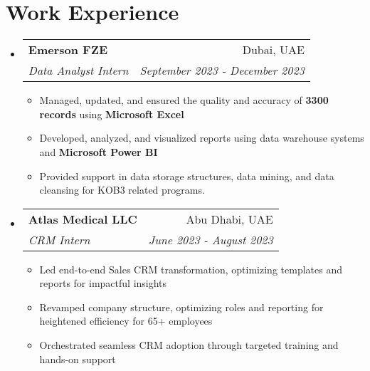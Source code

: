 \documentclass[a4paper,20pt]{article}
\makeatletter
\newcommand{\resumeItemWithoutTitle}[1] {
	\item\small{
		{#1 \vspace{-2pt}}
	}
}
\newcommand{\resumeSubheading}[4] {
	\vspace{-1pt}\item
	\begin{tabular*}{0.97\textwidth}{l@{\extracolsep{\fill}}r}
		\textbf{#1} & #2 \\
		\textit{#3} & \textit{#4} \\
	\end{tabular*}\vspace{-5pt}
}
\newcommand{\resumeSubHeadingListStart}{\begin{itemize}[leftmargin=*]}
\newcommand{\resumeSubHeadingListEnd}{\end{itemize}}
\newcommand{\resumeItemListStart}{\begin{itemize}}
\newcommand{\resumeItemListEnd}{\end{itemize}\vspace{-5pt}}
\makeatother
\begin{document}

\vspace{-3pt}
\section{Work Experience}
	\resumeSubHeadingListStart
		\resumeSubheading{Emerson FZE}{Dubai, UAE} {Data Analyst Intern}{September 2023 - December 2023}
		\resumeItemListStart
			\resumeItemWithoutTitle{Managed, updated, and ensured the quality and accuracy of \textbf{3300 records} using \textbf{Microsoft Excel}}
			\resumeItemWithoutTitle{Developed, analyzed, and visualized reports using data warehouse systems and \textbf{Microsoft Power BI}}
			\resumeItemWithoutTitle{Provided support in data storage structures, data mining, and data cleansing for KOB3 related programs.}
		\resumeItemListEnd
		\vspace{5pt}
		\resumeSubheading{Atlas Medical LLC}{Abu Dhabi, UAE} {CRM Intern}{June 2023 - August 2023}
		\resumeItemListStart
			\resumeItemWithoutTitle{Led end-to-end Sales CRM transformation, optimizing templates and reports for impactful insights}
			\resumeItemWithoutTitle{Revamped company structure, optimizing roles and reporting for heightened efficiency for 65+ employees}
			\resumeItemWithoutTitle{Orchestrated seamless CRM adoption through targeted training and hands-on support}
		\resumeItemListEnd
	\resumeSubHeadingListEnd
\vspace{2pt}
\end{document}
